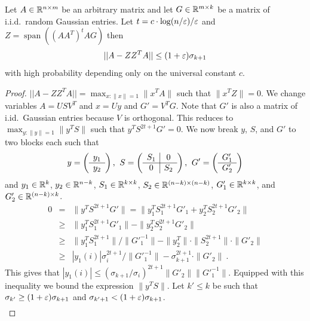 \documentclass{article}
\begin{document}
\begin{lemma} Let $A \in {\mathbb{R}}^{n \times m}$ be an arbitrary matrix and let $G \in {\mathbb{R}}^{m \times k}$ be a matrix of i.i.d.\ random Gaussian entries. 
Let $t = c\cdot \log(n/\varepsilon)/\varepsilon$ and $Z = \operatorname{span}((AA^T)^t A G)$ then
\[
||A - ZZ^TA|| \le (1+\varepsilon)\sigma_{k+1}
\]
with high probability depending only on the universal constant $c$.
\end{lemma}
\begin{proof}
$||A - ZZ^TA|| = \max_{x :\|x\|=1}  \|x^T A\|$ such that $\|x^TZ\| = 0$.
We change variables $A = USV^T$ and $x = Uy$ and $G' = V^TG$.
Note that $G'$ is also a matrix of i.id.\ Gaussian entries because $V$ is orthogonal.
This reduces to 
$\max_{y:\|y\|=1}  \|y^TS\|$ such that $y^TS^{2t+1}G' = 0$.
We now break $y$, $S$, and $G'$ to two blocks each such that
\[
y =
\left(\begin{array}{c}
y_1 \\ \hline
y_2 \\
\end{array}\right)
%
\mbox{,\;\;}
%
S = \left(\begin{array}{c|c}
S_1 & 0 \\ \hline
0 & S_2 \\
\end{array}\right)
%
\mbox{,\;\;}
%
G' = \left(\begin{array}{c}
G'_1  \\ \hline
G'_2 \\
\end{array}\right)
\] 
and $y_1 \in {\mathbb{R}}^{k}$, $y_2 \in {\mathbb{R}}^{n-k}$, $S_1 \in {\mathbb{R}}^{k \times k}$, $S_2 \in {\mathbb{R}}^{(n-k) \times (n-k)}$, $G'_1 \in {\mathbb{R}}^{k \times k}$, and $G'_2 \in {\mathbb{R}}^{(n-k) \times k}$.
\begin{eqnarray*}
0 &=& \|y^T S^{2t+1} G'\| = \|y_1^T S^{2t+1}_1 G'_1+  y_2^T S^{2t+1}_2 G'_2\| \\
&\ge& \|y_1^T S^{2t+1}_1 G'_1\| -  \|y_2^T S^{2t+1}_2 G'_2\| \\
&\ge& \|y_1^T S^{2t+1}_1\|/\|G'^{-1}_1\| - \|y_2^T\| \cdot \|S^{2t+1}_2 \| \cdot  \|G'_2\| \\
&\ge& |y_1(i)| \sigma_{i}^{2t+1}/\|G'^{-1}_1\| - \sigma_{k+1}^{2t+1} \cdot  \|G'_2\| \ .
\end{eqnarray*}
\noindent This gives that $|y_1(i)| \le (\sigma_{k+1}/\sigma_i)^{2t+1}\|G'_2\| \|G'^{-1}_1\|$. Equipped with this inequality we bound the expression $\|y^TS\|$.
Let $k' \le k$ be such that $\sigma_{k'} \ge (1+\varepsilon)\sigma_{k+1}$ and $\sigma_{k'+1} < (1+\varepsilon)\sigma_{k+1}$.
\begin{eqnarray}

\end{eqnarray}
\end{proof}
\end{document}
